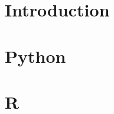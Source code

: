 \documentclass{article}
\begin{document}
\section*{Introduction}

\section*{Python}

\section*{R}
\end{document}
